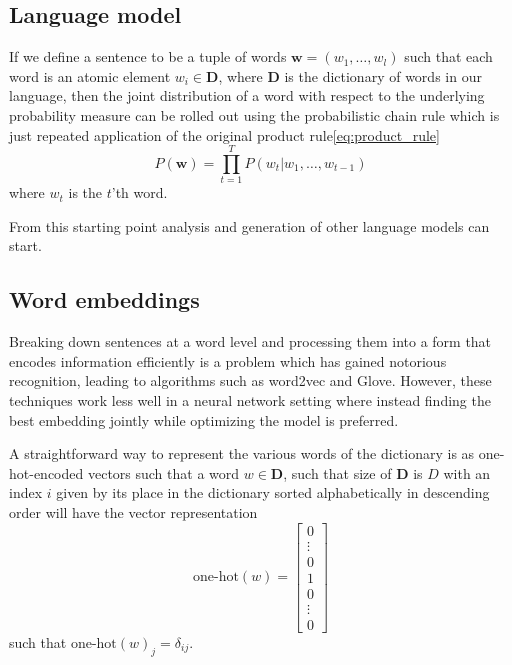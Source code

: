 \subsection{Language model}
If we define a sentence to be a tuple of words $\bm{w} = (w_1, \dots,
w_l)$ such that each word is an atomic element $w_i \in \mathbf{D}$, where $\mathbf{D}$ is the
dictionary of words in our language, then the joint distribution of a word with
respect to the underlying probability measure can be rolled out using the
probabilistic chain rule which is just repeated application of the original
product rule\ref{eq:product_rule}
\begin{equation}
  \label{eq:conditional_language_probability}
  P(\bm{w}) = \prod_{t = 1}^TP(w_t | w_1, \dots, w_{t-1})
\end{equation}
where $w_t$ is the $t$'th word.\cite{Bengio:2003:NPL:944919.944966}

From this starting point analysis and generation of other language models can start.

\subsection{Word embeddings}
Breaking down sentences at a word level and processing them into a form that
encodes information efficiently is a problem which has gained notorious
recognition, leading to algorithms such as word2vec and
Glove\cite{DBLP:journals/corr/abs-1301-3781, Pennington14glove:global,
  Mikolov:2013:DRW:2999792.2999959}. However, these techniques work less well in
a neural network setting where instead finding the best embedding jointly while
optimizing the model is preferred\cite[p.~5-7]{goldberg2015primer}.

A straightforward way to represent the various words of the dictionary is as
one-hot-encoded vectors such that a word $w \in \mathbf{D}$, such that size of
$\mathbf{D}$ is $D$ with an index $i$
given by its place in the dictionary sorted alphabetically in descending order
will have the vector representation
\begin{equation}
  \label{eq:one_hot_encoding}
  \text{one-hot}(w) =
  \begin{bmatrix}
    0 \\
    \vdots \\
    0 \\
    1 \\
    0 \\
    \vdots \\
    0
  \end{bmatrix}
\end{equation}\cite[p.~6]{goldberg2015primer}
such that $\text{one-hot}(w)_{j} = \delta_{ij}$.

